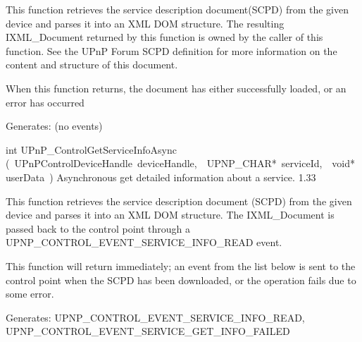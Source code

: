 \documentclass{article}
\begin{document}
\begin{cxxentry}
\begin{cxxfunction}
\begin{cxxdoc}
This function retrieves the service description document(SCPD) from the
given device and parses it into an XML DOM structure.  The resulting
IXML\_Document returned by this function is owned by the caller of this
function.  See the UPnP Forum SCPD definition for more information on
the content and structure of this document.

When this function returns, the document has either successfully loaded,
or an error has occurred

Generates:
(no events)


\end{cxxdoc}
\end{cxxfunction}
\begin{cxxfunction}
{int}
        {UPnP\_ControlGetServiceInfoAsync}
        {(\ UPnPControlDeviceHandle\ deviceHandle,\ \ UPNP\_CHAR*\ serviceId,\ \ void*\ userData\ )}
        {Asynchronous get detailed information about a service. }
        {1.33}
\begin{cxxdoc}

This function retrieves the service description document (SCPD) from
the given device and parses it into an XML DOM structure.  The
IXML\_Document is passed back to the control point through a
UPNP\_CONTROL\_EVENT\_SERVICE\_INFO\_READ event.

This function will return immediately; an event from the list below
is sent to the control point when the SCPD has been downloaded, or the
operation fails due to some error.

Generates:
UPNP\_CONTROL\_EVENT\_SERVICE\_INFO\_READ,
UPNP\_CONTROL\_EVENT\_SERVICE\_GET\_INFO\_FAILED



\end{cxxdoc}
\end{cxxfunction}
\end{cxxentry}
\end{document}
